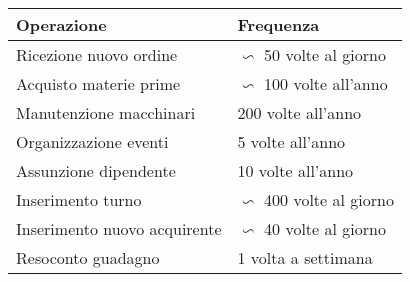\begin{center}
	\begin{tabular}{P{9.5cm}P{6cm}}
		\toprule
		 Operazione & Frequenza \\
		\midrule
		Ricezione nuovo ordine & $\backsim$ 50 volte al giorno\\
		\midrule
		Acquisto materie prime & $\backsim$ 100 volte all'anno\\
		\midrule
		Manutenzione macchinari & 200 volte all'anno\\
		\midrule
		Organizzazione eventi & 5 volte all'anno\\
		\midrule
		Assunzione dipendente & 10 volte all'anno\\
		\midrule
		Inserimento turno & $\backsim$ 400 volte al giorno\\
		\midrule
		Inserimento nuovo acquirente & $\backsim$ 40 volte al giorno\\
		\midrule
		Resoconto guadagno & 1 volta a settimana\\
		\bottomrule
	\end{tabular}
\end{center}